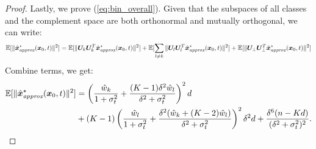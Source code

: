 \begin{proof}
    Lastly, we prove (\ref{eq:bin_overall}). Given that the subspaces of all classes and the complement space are both orthonormal and mutually orthogonal, we can write:
    \begin{align*}
        \operatorname{\mathbb{E}}[\| \hat{\bm x}_{\textit{approx}}^{\star}(\bm x_0, t) \|^2] = \operatorname{\mathbb{E}}[\| \bm U_k \bm U_k^T \hat{\bm x}_{\textit{approx}}^{\star}(\bm x_0, t)\|^2] + \operatorname{\mathbb{E}}[\sum_{l \neq k}\| \bm U_l \bm U_l^T \hat{\bm x}_{\textit{approx}}^{\star}(\bm x_0, t)\|^2] + \operatorname{\mathbb{E}}[\| \bm U_{\perp} \bm U_{\perp}^T \hat{\bm x}_{\textit{approx}}^{\star}(\bm x_0, t)\|^2]
    \end{align*}
    Combine terms, we get:
    \begin{align*}
        \operatorname{\mathbb{E}}[\|\hat{\bm x}_{\textit{approx}}^{\star}(\bm x_0, t)\|^2] &= \left( \frac{\hat{w}_k}{1 + \sigma_t^2} + \frac{(K-1)\delta^2\hat{w}_l}{\delta^2+\sigma_t^2}\right)^2 d \\
        &+ \left( K-1 \right)\left( \frac{\hat{w}_l}{1+\sigma_t^2} + \frac{\delta^2(\hat{w}_k + (K-2)\hat{w}_l)}{\delta^2 + \sigma_t^2} \right)^2 \delta^2 d + \frac{\delta^6 (n-Kd)}{(\delta^2 + \sigma_t^2)^2}.
    \end{align*}
\end{proof}






